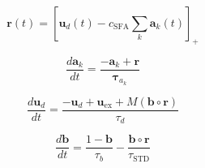 \documentclass{article}
\begin{document}
\[
\boldsymbol{r}(t) =
\left[
\boldsymbol{u}_d(t) - c_{\text{SFA}} \sum_k \boldsymbol{a}_k(t)
\right]_+
\]

\[
\frac{d \boldsymbol{a}_k}{dt}
= \frac{-\boldsymbol{a}_k + \boldsymbol{r}}{\boldsymbol{\tau}_{a_k}}
\]

\[
\frac{d \boldsymbol{u}_d}{dt}
= \frac{-\boldsymbol{u}_d + \boldsymbol{u}_{\text{ex}} + M \left( \boldsymbol{b} \circ \boldsymbol{r} \right)}{\tau_d}
\]

\[
\frac{d \boldsymbol{b}}{dt}
= \frac{1 - \boldsymbol{b}}{\tau_b} - \frac{\boldsymbol{b} \circ \boldsymbol{r}}{\tau_{\text{STD}}}
\]
\end{document}
